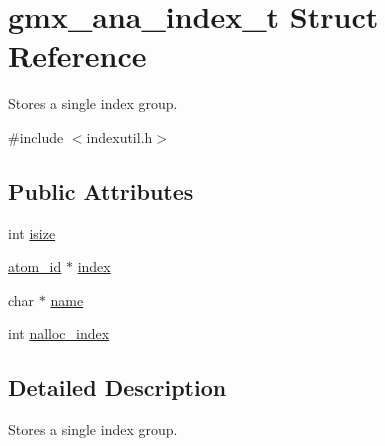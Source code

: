 \hypertarget{structgmx__ana__index__t}{\section{gmx\-\_\-ana\-\_\-index\-\_\-t \-Struct \-Reference}
\label{structgmx__ana__index__t}
}


\-Stores a single index group.  




{\ttfamily \#include $<$indexutil.\-h$>$}

\subsection*{\-Public \-Attributes}
\begin{DoxyCompactItemize}
\item 
int \hyperlink{structgmx__ana__index__t_a0ee0f8838647bdb58ddf24845bfa3895}{isize}
\item 
\hyperlink{include_2types_2simple_8h_ad3f47cdb48677e516e2049719612c737}{atom\-\_\-id} $\ast$ \hyperlink{structgmx__ana__index__t_ac8e326a1a1c746bf97407622f78e7a38}{index}
\item 
char $\ast$ \hyperlink{structgmx__ana__index__t_adc31ad352ddba9fb1eba0fd4aebed5ac}{name}
\item 
int \hyperlink{structgmx__ana__index__t_abdf9721c6ce9a94c792dda46cb360fd3}{nalloc\-\_\-index}
\end{DoxyCompactItemize}


\subsection{\-Detailed \-Description}
\-Stores a single index group. 

